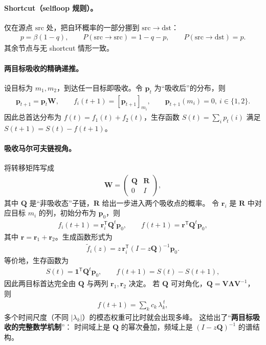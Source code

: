 \documentclass[11pt]{ctexart}
\begin{document}
\paragraph{Shortcut（selfloop 规则）。}
仅在源点 $\mathrm{src}$ 处，把自环概率的一部分挪到 $\mathrm{src}\to\mathrm{dst}$：
\begin{align}
  p=\beta(1-q),\qquad P(\mathrm{src}\to\mathrm{src})=1-q-p,\qquad P(\mathrm{src}\to\mathrm{dst})=p.
\end{align}
其余节点与无 shortcut 情形一致。

\paragraph{两目标吸收的精确递推。}
设目标为 $m_1,m_2$，到达任一目标即吸收。令 $\mathbf{p}_t$ 为“吸收后”的分布，则
\begin{align}
  \mathbf{p}_{t+1}=\mathbf{p}_t\mathbf{W},\qquad
  f_i(t+1)=[\mathbf{p}_{t+1}]_{m_i},\qquad
  \mathbf{p}_{t+1}(m_i)=0,\ i\in\{1,2\}.
\end{align}
因此总首达分布为 $f(t)=f_1(t)+f_2(t)$，生存函数
$S(t)=\sum_i p_t(i)$ 满足 $S(t+1)=S(t)-f(t+1)$。

\paragraph{吸收马尔可夫链视角。}
将转移矩阵写成
\begin{align}
\mathbf{W}=\begin{pmatrix}\mathbf{Q} & \mathbf{R}\\ 0 & I\end{pmatrix},
\end{align}
其中 $\mathbf{Q}$ 是“非吸收态”子链，$\mathbf{R}$ 给出一步进入两个吸收点的概率。
令 $\mathbf{r}_i$ 是 $\mathbf{R}$ 中对应目标 $m_i$ 的列，初始分布为 $\mathbf{p}_0$，则
\begin{align}
  f_i(t+1)=\mathbf{r}_i^{\mathsf T}\mathbf{Q}^{t}\mathbf{p}_0,\qquad
  f(t+1)=\mathbf{r}^{\mathsf T}\mathbf{Q}^{t}\mathbf{p}_0,
\end{align}
其中 $\mathbf{r}=\mathbf{r}_1+\mathbf{r}_2$。生成函数形式为
\begin{align}
  \widetilde f_i(z)=z\,\mathbf{r}_i^{\mathsf T}(I-z\mathbf{Q})^{-1}\mathbf{p}_0.
\end{align}
等价地，生存函数为
\begin{align}
  S(t)=\mathbf{1}^{\mathsf T}\mathbf{Q}^{t}\mathbf{p}_0,\qquad f(t+1)=S(t)-S(t+1),
\end{align}
因此两目标首达完全由 $\mathbf{Q}$ 与两列 $\mathbf{r}_1,\mathbf{r}_2$ 决定。
若 $\mathbf{Q}$ 可对角化，$\mathbf{Q}=\mathbf{V}\mathbf{\Lambda}\mathbf{V}^{-1}$，
则
\begin{align}
  f(t+1)=\sum_k c_k\,\lambda_k^{\,t},
\end{align}
多个时间尺度（不同 $|\lambda_k|$）的模态权重可比时就会出现多峰。
这给出了“\textbf{两目标吸收的完整数学机制}”：
时间域上是 $\mathbf{Q}$ 的幂次叠加，频域上是 $(I-z\mathbf{Q})^{-1}$ 的谱结构。
\end{document}
